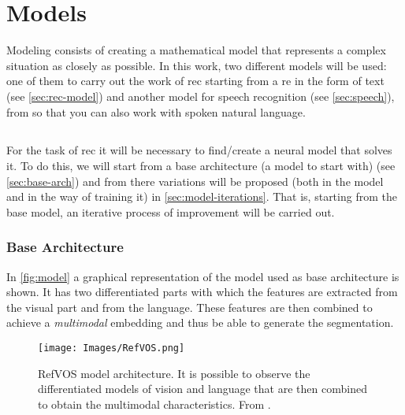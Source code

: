 

\chapter{Models}\label{cha:model}



\drop Modeling consists of creating a mathematical model that represents a
complex situation as closely as possible. In this work, two different models
will be used: one of them to carry out the work of \gls{rec} starting from a
\gls{re} in the form of text (see \vref{sec:rec-model}) and another model for
speech recognition (see \vref{sec:speech}), from so that you can also work with
spoken natural language.



\section{}\label{sec:rec-model}

For the task of \gls{rec} it will be necessary to find/create a neural model
that solves it. To do this, we will start from a base architecture (a model to
start with) (see \vref{sec:base-arch}) and from there variations will be
proposed (both in the model and in the way of training it) in
\vref{sec:model-iterations}. That is, starting from the base model, an
iterative process of improvement will be carried out.


\subsection{Base Architecture}\label{sec:base-arch}

In \vref{fig:model} a graphical representation of the model used as base
architecture is shown. It has two differentiated parts with which the features
are extracted from the visual part and from the language. These features are
then combined to achieve a \emph{multimodal} embedding and thus be able to
generate the segmentation.

\begin{figure}[ht]
  \centering
  \texttt{[image: Images/RefVOS.png]}
  \caption[RefVOS model architecture]{RefVOS model architecture. It is possible
    to observe the differentiated models of vision and language that are then
    combined to obtain the multimodal characteristics. From
    .}\label{fig:model}
\end{figure}

